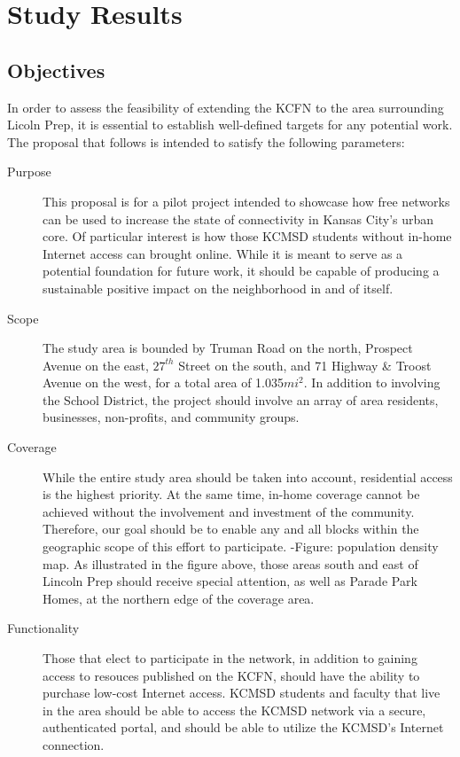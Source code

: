 \section{Study Results}\label{LPA}

\subsection{Objectives}
In order to assess the feasibility of extending the KCFN to the area surrounding
Licoln Prep, it is essential to establish well-defined targets for any potential
work. The proposal that follows is intended to satisfy the following parameters:

\begin{description}
\item[Purpose] This proposal is for a pilot project intended to showcase how
free networks can be used to increase the state of connectivity in Kansas City's
urban core. Of particular interest is how those KCMSD students without in-home
Internet access can brought online. While it is meant to serve as a potential foundation for future work, it
should be capable of producing a sustainable positive impact on the
neighborhood in and of itself.

\item[Scope] The study area is bounded by Truman Road on the north, Prospect
Avenue on the east, $27^{th}$ Street on the south, and 71 Highway \& Troost
Avenue on the west, for a total area of 1.035$mi^{2}$. In addition to involving
the School District, the project should involve an array of area residents,
businesses, non-profits, and community groups. 

\item[Coverage] While the entire study area should be taken into account,
residential access is the highest priority. At the same time, in-home coverage
cannot be achieved without the involvement and investment of the community.
Therefore, our goal should be to enable any and all blocks within
the geographic scope of this effort to participate.
-Figure: population density map.
As illustrated in the figure above, those areas south and east of Lincoln Prep
should receive special attention, as well as Parade Park Homes, at the northern
edge of the coverage area.

\item[Functionality] Those that elect to participate in the network, in addition
to gaining access to resouces published on the KCFN, should have the
ability to purchase low-cost Internet access. KCMSD students and faculty that live in
the area should be able to access the KCMSD network via a secure, authenticated portal,
and should be able to utilize the KCMSD's Internet connection.


\end{description}
